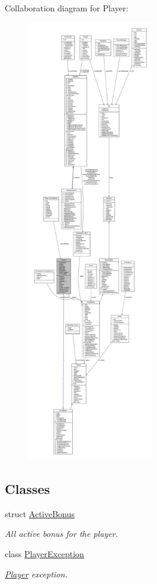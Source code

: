 Collaboration diagram for Player\+:
\nopagebreak
\begin{figure}[H]
\begin{center}
\leavevmode
\includegraphics[height=550pt]{class_player__coll__graph}
\end{center}
\end{figure}
\subsection*{Classes}
\begin{DoxyCompactItemize}
\item 
struct \hyperlink{struct_player_1_1_active_bonus}{Active\+Bonus}
\begin{DoxyCompactList}\small\item\em All active bonus for the player. \end{DoxyCompactList}\item 
class \hyperlink{class_player_1_1_player_exception}{Player\+Exception}
\begin{DoxyCompactList}\small\item\em \hyperlink{class_player}{Player} exception. \end{DoxyCompactList}\end{DoxyCompactItemize}
